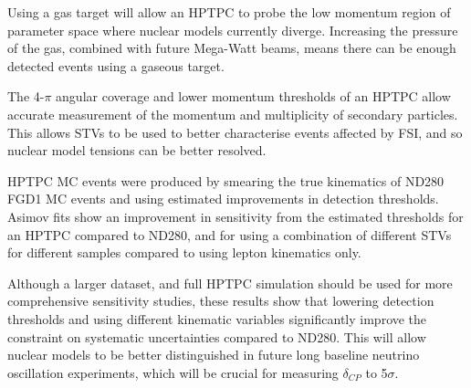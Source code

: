 Using a gas target will allow an HPTPC to probe the low momentum region of parameter space where nuclear models currently diverge. Increasing the pressure of the gas, combined with future Mega-Watt beams, means there can be enough detected events using a gaseous target. 

The 4-$\pi$ angular coverage and lower momentum thresholds of an HPTPC allow accurate measurement of the momentum and multiplicity of secondary particles. This allows STVs to be used to better characterise events affected by FSI, and so nuclear model tensions can be better resolved.

HPTPC MC events were produced by smearing the true kinematics of ND280 FGD1 MC events and using estimated improvements in detection thresholds. Asimov fits show an improvement in sensitivity from the estimated thresholds for an HPTPC compared to ND280, and for using a combination of different STVs for different samples compared to using lepton kinematics only.

Although a larger dataset, and full HPTPC simulation should be used for more comprehensive sensitivity studies, these results show that lowering detection thresholds and using different kinematic variables significantly improve the constraint on systematic uncertainties compared to ND280. This will allow nuclear models to be better distinguished in future long baseline neutrino oscillation experiments, which will be crucial for measuring $\delta_{CP}$ to 5$\sigma$.



\newpage